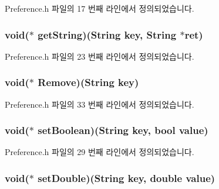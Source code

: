 Preference.\-h 파일의 17 번째 라인에서 정의되었습니다.

\hypertarget{struct___preference_adb1c477dbd0c3e00ee2ba27168145ac1}{
\subsubsection[{get\-String}]{\setlength{\rightskip}{0pt plus 5cm}void($\ast$  get\-String)({\bf String} key, {\bf String} $\ast$ret)}}\label{struct___preference_adb1c477dbd0c3e00ee2ba27168145ac1}


Preference.\-h 파일의 23 번째 라인에서 정의되었습니다.

\hypertarget{struct___preference_a90568077b029ed3e0b1602de2448ace5}{
\subsubsection[{Remove}]{\setlength{\rightskip}{0pt plus 5cm}void($\ast$  Remove)({\bf String} key)}}\label{struct___preference_a90568077b029ed3e0b1602de2448ace5}


Preference.\-h 파일의 33 번째 라인에서 정의되었습니다.

\hypertarget{struct___preference_a7a60c27995791a32705d277621ce9d4b}{
\subsubsection[{set\-Boolean}]{\setlength{\rightskip}{0pt plus 5cm}void($\ast$  set\-Boolean)({\bf String} key, bool value)}}\label{struct___preference_a7a60c27995791a32705d277621ce9d4b}


Preference.\-h 파일의 29 번째 라인에서 정의되었습니다.

\hypertarget{struct___preference_a254206bd3d65b6005aa12230f4297321}{
\subsubsection[{set\-Double}]{\setlength{\rightskip}{0pt plus 5cm}void($\ast$  set\-Double)({\bf String} key, double value)}}\label{struct___preference_a254206bd3d65b6005aa12230f4297321}


